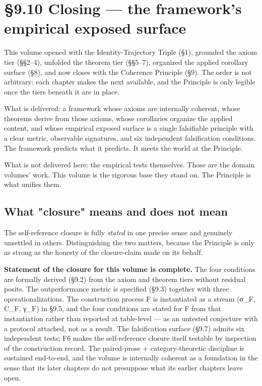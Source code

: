 \documentclass[11pt, openany]{book}
\newcommand{\sectionbreak}{\clearpage}
\begin{document}
\begin{itemize}
\end{itemize}

\sectionbreak

\section{§9.10 Closing --- the framework's empirical exposed surface}

This volume opened with the Identity-Trajectory Triple (§1), grounded the axiom tier (§§2–4), unfolded the theorem tier (§§5–7), organized the applied corollary surface (§8), and now closes with the Coherence Principle (§9). The order is not arbitrary: each chapter makes the next available, and the Principle is only legible once the tiers beneath it are in place.

What is delivered: a framework whose axioms are internally coherent, whose theorems derive from those axioms, whose corollaries organize the applied content, and whose empirical exposed surface is a single falsifiable principle with a clear metric, observable signatures, and six independent falsification conditions. The framework predicts what it predicts. It meets the world at the Principle.

What is not delivered here: the empirical tests themselves. Those are the domain volumes' work. This volume is the rigorous base they stand on. The Principle is what unifies them.

\subsection{What "closure" means and does not mean}

The self-reference closure is fully \textit{stated} in one precise sense and genuinely unsettled in others. Distinguishing the two matters, because the Principle is only as strong as the honesty of the closure-claim made on its behalf.

\textbf{Statement of the closure for this volume is complete.} The four conditions are formally derived (§9.2) from the axiom and theorem tiers without residual posits. The outperformance metric is specified (§9.3) together with three operationalizations. The construction process F is instantiated as a stream (σ\_\allowbreak{}F, C\_\allowbreak{}F, γ\_\allowbreak{}F) in §9.5, and the four conditions are stated for F from that instantiation rather than reported at table-level --- as an untested conjecture with a protocol attached, not as a result. The falsification surface (§9.7) admits six independent tests; F6 makes the self-reference closure itself testable by inspection of the construction record. The paired-prose + category-theoretic discipline is sustained end-to-end, and the volume is internally coherent as a foundation in the sense that its later chapters do not presuppose what its earlier chapters leave open.
\end{document}
